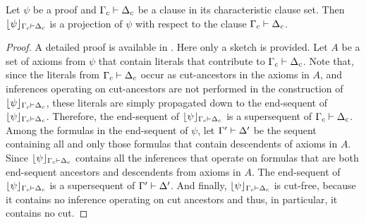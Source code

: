 \documentclass{llncs}
\begin{document}
\begin{theorem}
Let $\psi$ be a proof and $\Gamma_c \vdash \Delta_c$ be a clause in its characteristic clause set. Then $\lfloor \psi \rfloor_{\Gamma_c \vdash \Delta_c}$ is a projection of $\psi$ with respect to the clause $\Gamma_c \vdash \Delta_c$.
\end{theorem}
\begin{proof}
A detailed proof is available in \cite{ToDo}. Here only a sketch is provided. Let $A$ be a set of axioms from $\psi$ that contain literals that contribute to $\Gamma_c \vdash \Delta_c$. Note that, since the literals from $\Gamma_c \vdash \Delta_c$ occur as cut-ancestors in the axioms in $A$, and inferences operating on cut-ancestors are not performed in the construction of $\lfloor \psi \rfloor_{\Gamma_c \vdash \Delta_c}$, these literals are simply propagated down to the end-sequent of $\lfloor \psi \rfloor_{\Gamma_c \vdash \Delta_c}$. Therefore, the end-sequent of $\lfloor \psi \rfloor_{\Gamma_c \vdash \Delta_c}$ is a supersequent of $\Gamma_c \vdash \Delta_c$. Among the formulas in the end-sequent of $\psi$, let $\Gamma' \vdash \Delta'$ be the sequent containing all and only those formulas that contain descendents of axioms in $A$. Since $\lfloor \psi \rfloor_{\Gamma_c \vdash \Delta_c}$ contains all the inferences that operate on formulas that are both end-sequent ancestors and descendents from axioms in $A$. The end-sequent of $\lfloor \psi \rfloor_{\Gamma_c \vdash \Delta_c}$ is a supersequent of $\Gamma' \vdash \Delta'$. And finally, $\lfloor \psi \rfloor_{\Gamma_c \vdash \Delta_c}$ is cut-free, because it contains no inference operating on cut ancestors and thus, in particular, it contains no cut.
\end{proof}
\end{document}
